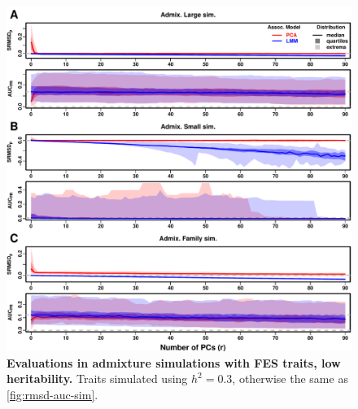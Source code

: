 \documentclass[11pt]{article}
\begin{document}
\begin{figure}[hp!]
  \centering
  \includegraphics[width=\textwidth,height=\textheight,keepaspectratio]{fes/m_causal_fac-27/h0.3/rmsd-auc-sim.pdf}
  \caption{
    {\bf Evaluations in admixture simulations with FES traits, low heritability.}
    Traits simulated using $h^2=0.3$, otherwise the same as \cref{fig:rmsd-auc-sim}.
  }
  \label{fig:rmsd-auc-sim-fes-h3}
\end{figure}
\end{document}
